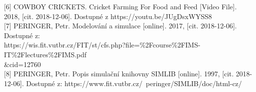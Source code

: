 \documentclass[a4paper, 12pt]{article}
\begin{document}
[6] COWBOY CRICKETS. Cricket Farming For Food and Feed [Video File]. 2018, [cit. 2018-12-06]. Dostupné z https://youtu.be/JUgDsxWYSS8\\

[7] PERINGER, Petr. Modelování a simulace [online]. 2017, [cit. 2018-12-06]. Dostupné z:\\ https://wis.fit.vutbr.cz/FIT/st/cfs.php?file=\%2Fcourse\%2FIMS-IT\%2Flectures\%2FIMS.pdf\\\&cid=12760 \\

[8] PERINGER, Petr. Popis simulační knihovny SIMLIB [online]. 1997, [cit. 2018-12-06]. Dostupné z: https://www.fit.vutbr.cz/~peringer/SIMLIB/doc/html-cz/
\end{document}
